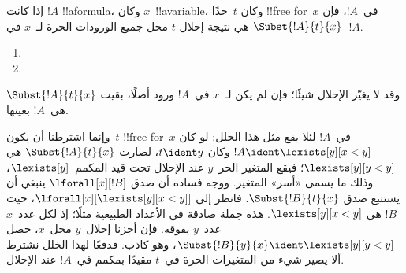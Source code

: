 \documentclass[../../../include/open-logic-section]{subfiles}
\begin{document}
\begin{defn}
إذا كانت $!A$ !!a{formula}، وكان $x$~!!a{variable}، وكان $t$~حدًا
!!{free for}~$x$ في~$!A$، فإن $\Subst{!A}{t}{x}$ هي نتيجة إحلال
$t$ محل جميع الورودات الحرة لـ~$x$ في~$!A$.
\begin{enumerate}


\item {}

\item {}







\end{enumerate}
\end{defn}

\begin{explain}
وقد لا يغيّر الإحلال شيئًا؛ فإن لم يكن لـ~$x$ في~$!A$ ورود أصلًا،
بقيت $\Subst{!A}{t}{x}$ هي~$!A$ بعينها.

وإنما اشترطنا أن يكون~$t$ !!{free for}~$x$ في~$!A$ لئلا يقع
مثل هذا الخلل: لو كان $!A \ident \lexists[y][x < y]$ وكان $t \ident y$،
لصارت $\Subst{!A}{t}{x}$ هي $\lexists[y][y < y]$؛ فيقع المتغير
الحر~$y$ عند الإحلال تحت قيد المكمم~$\lexists[y]$، وذلك ما يسمى
«أسر» المتغير. ووجه فساده أن صدق $\lforall[x][!B]$ ينبغي أن يستتبع
صدق $\Subst{!B}{t}{x}$. فانظر إلى
$\lforall[x][\lexists[y][x < y]]$، حيث $!B$ هي $\lexists[y][x <
  y]$. هذه جملة صادقة في الأعداد الطبيعية مثلًا؛ إذ لكل عدد~$x$
عدد~$y$ يفوقه. فإن أجزنا إحلال~$y$ محل~$x$، حصل
$\Subst{!B}{y}{x} \ident \lexists[y][y < y]$، وهو كاذب.
فدفعًا لهذا الخلل نشترط ألا يصير شيء من المتغيرات الحرة في~$t$
مقيدًا بمكمم في~$!A$ عند الإحلال.
\end{explain}
\end{document}
